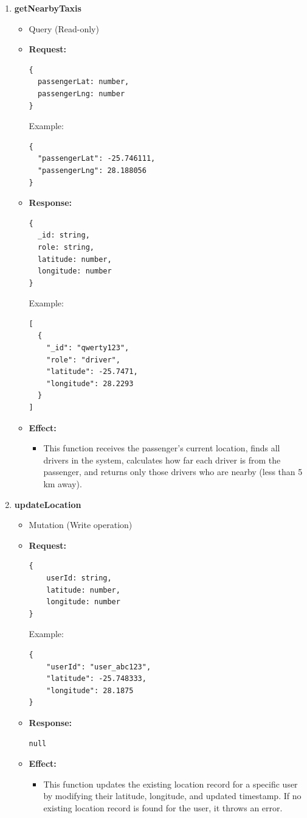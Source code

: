 \documentclass[a4paper,12pt]{article}
\begin{document}
\begin{enumerate}
  \item \textbf{getNearbyTaxis}
    \begin{itemize}
      \item Query (Read-only)
      \item \textbf{Request:}
      \begin{verbatim}
{
  passengerLat: number,
  passengerLng: number
}
      \end{verbatim}
      Example:
      \begin{verbatim}
{
  "passengerLat": -25.746111,
  "passengerLng": 28.188056
}
      \end{verbatim}
      \item \textbf{Response:}
      \begin{verbatim}
{
  _id: string,
  role: string,
  latitude: number,
  longitude: number
}
      \end{verbatim}
      Example:
      \begin{verbatim}
[
  {
    "_id": "qwerty123",
    "role": "driver",
    "latitude": -25.7471,
    "longitude": 28.2293
  }
]
      \end{verbatim}
      \item \textbf{Effect:}
      \begin{itemize}
        \item This function receives the passenger's current location, finds all drivers in the system, calculates how far each driver is from the passenger, and returns only those drivers who are nearby (less than 5 km away).
      \end{itemize}
    \end{itemize}

    \item \textbf{updateLocation}
    \begin{itemize}
        \item Mutation (Write operation)
        \item \textbf{Request:}
        \begin{verbatim}
{
    userId: string,
    latitude: number,
    longitude: number
}
        \end{verbatim}
        Example:
        \begin{verbatim}
{
    "userId": "user_abc123",
    "latitude": -25.748333,
    "longitude": 28.1875
}
        \end{verbatim}
        \item \textbf{Response:}
        \begin{verbatim}
null
        \end{verbatim}
        \item \textbf{Effect:}
        \begin{itemize}
            \item This function updates the existing location record for a specific user by modifying their latitude, longitude, and updated timestamp. If no existing location record is found for the user, it throws an error.
        \end{itemize}
    \end{itemize}


\end{enumerate}
\end{document}
